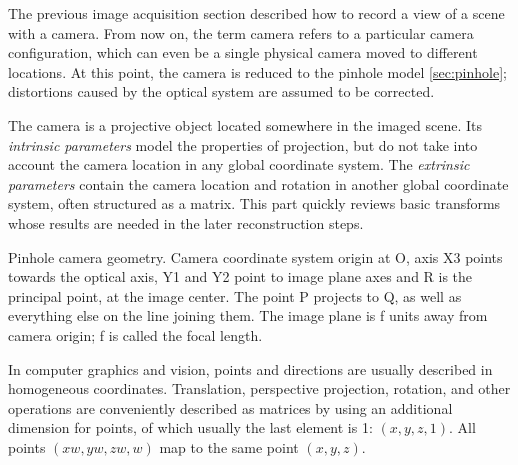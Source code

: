 


The previous image acquisition section described how to record a view of a scene with a camera. From now on, the term camera refers to a particular camera configuration, which can even be a single physical camera moved to different locations.
At this point, the camera is reduced to the pinhole model \ref{sec:pinhole}; distortions caused by the optical system are assumed to be corrected.


The camera is a projective object located somewhere in the imaged scene.
Its \textit{intrinsic parameters} model the properties of projection, but do not take into account the camera location in any global coordinate system.
The \textit{extrinsic parameters} contain the camera location and rotation in another global coordinate system, often structured as a matrix.
\cite{hartley03multiview,heyden2005multiple}
This part quickly reviews basic transforms whose results are needed in the later reconstruction steps.


{Pinhole camera geometry. Camera coordinate system origin at O, axis X3 points towards the optical axis, Y1 and Y2 point to image plane axes and R is the principal point, at the image center. The point P projects to Q, as well as everything else on the line joining them. The image plane is f units away from camera origin; f is called the focal length.}

In computer graphics and vision, points and directions are usually described in homogeneous coordinates.
Translation, perspective projection, rotation, and other operations are conveniently described as matrices by using an additional dimension for points, of which usually the last element is 1: $(x, y, z, 1)$.
All points $(xw, yw, zw, w)$ map to the same point $(x, y, z)$.
\cite{dubrofsky2009homography,hartley03multiview}

